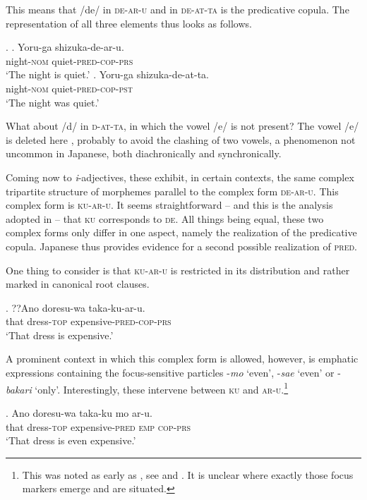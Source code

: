 This means that /de/ in \textsc{de-ar-u} and in \textsc{de-at-ta} is the predicative copula. The representation of all three elements thus looks as follows.

\ex. \ag. Yoru-ga shizuka-de-ar-u.\\
night-\textsc{nom} quiet-\textsc{pred-cop-prs}\\
`The night is quiet.'
\bg. Yoru-ga shizuka-de-at-ta.\\
night-\textsc{nom} quiet-\textsc{pred-cop-pst}\\
`The night was quiet.' \null \hfill \citep[189, 194]{nishiyama:1999:adj}

What about /d/ in \textsc{d-at-ta}, in which the vowel /e/ is not present? The vowel /e/ is deleted here \citep[203]{nishiyama:1999:adj}, probably to avoid the clashing of two vowels, a phenomenon not uncommon in Japanese, both diachronically and synchronically.

Coming now to \textit{i}-adjectives, these exhibit, in certain contexts, the same complex tripartite structure of morphemes parallel to the complex form \textsc{de-ar-u}. This complex form is \textsc{ku-ar-u}. It seems straightforward – and this is the analysis adopted in \citet{nishiyama:1999:adj} – that \textsc{ku} corresponds to \textsc{de}. All things being equal, these two complex forms only differ in one aspect, namely the realization of the predicative copula. Japanese thus provides evidence for a second possible realization of \textsc{pred}.

One thing to consider is that \textsc{ku-ar-u} is restricted in its distribution and rather marked in canonical root clauses. 

\exg. ??Ano doresu-wa taka-ku-ar-u.\\
that dress-\textsc{top} expensive-\textsc{pred-cop-prs}\\
`That dress is expensive.'

\newpage
A prominent context in which this complex form is allowed, however, is emphatic expressions containing the focus-sensitive particles -\textit{mo} `even', -\textit{sae} `even' or -\textit{bakari} `only’. Interestingly, these intervene between \textsc{ku} and \textsc{ar-u}.\footnote{This was noted as early as \citet{miyata:1948:nihongo}, see \citet[185]{nishiyama:1999:adj} and \citet{kubo:1992:japanese}. It is unclear where exactly those focus markers emerge and are situated.}

\exg. Ano doresu-wa taka-ku mo ar-u.\\
that dress-\textsc{top} expensive-\textsc{pred} \textsc{emp} \textsc{cop-prs}\\
`That dress is even expensive.'

